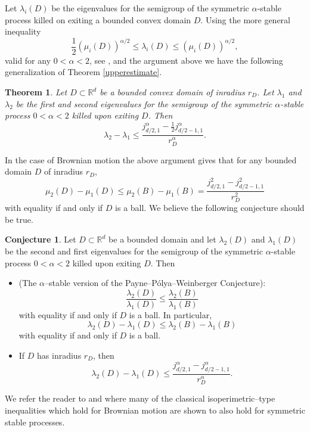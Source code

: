 \documentclass[11pt,leqno]{article}
\newtheorem{thm}{Theorem}[section]
\theoremstyle{definition}
\newtheorem{conj}{Conjecture}[section]
\newcommand{\Rd}{\mathbb{R}^d}
\numberwithin{equation}{section}
\begin{document}
Let $\lambda_i(D)$ be the eigenvalues for the semigroup of the symmetric $\alpha$-stable process killed on
exiting a bounded convex domain $D$. Using the more general inequality 
\begin{equation}
\frac{1}{2} \left(\mu_i(D)\right)^{\alpha/2}\leq \lambda_i(D)\leq \left(\mu_i(D)\right)^{\alpha/2},
\end{equation}
valid for any $0 < \alpha < 2$, see \cite{DeMe},  \cite{CS3} and the argument
above we have the following generalization of Theorem \ref{upperestimate}.
\begin{thm}
Let $D\subset \Rd$ be a bounded convex domain of inradius $r_D$.  Let $\lambda_1$ and
$\lambda_2$ be the  first and second eigenvalues for the semigroup of the symmetric 
$\alpha$-stable process $0 < \alpha < 2$ killed upon
exiting $D$.  Then 
\begin{equation} 
\lambda_2 - \lambda_1 \leq
{\frac{j_{{d/2}, 1}^{\alpha}-{\frac{1}{2}}j_{{d/2-1}, 1}^{\alpha}}{r_D^{\alpha}}}.
\end{equation}
\end{thm}

In the case of Brownian motion  the above argument gives  that for any bounded domain $D$ of
inradius $r_D$, 
\begin{equation} 
\mu_2(D) - \mu_1(D) \leq \mu_2(B) - \mu_1(B)=
{\frac{j_{{d/2}, 1}^{2}-j_{{d/2-1}, 1}^{2}}{r_D^{2}}}
\end{equation} 
with equality if and only if $D$ is a ball.    We believe the following conjecture
should be true. 
\begin{conj} Let $D\subset \Rd$ be a bounded domain and let $\lambda_2(D)$ and $\lambda_1(D)$ be the
second and first eigenvalues for the semigroup of the symmetric $\alpha$-stable process $0 < \alpha < 2$ killed upon
exiting $D$.  Then 
\begin{itemize}
\item[(i)] (The $\alpha$--stable version of the Payne--P\'olya--Weinberger Conjecture): 
\begin{equation*} 
\frac{\lambda_2(D) }{\lambda_1(D)} \leq
\frac{\lambda_2(B) }{\lambda_1(B)} 
\end{equation*}
with equality if and only if $D$ is a ball.  In particular, 
\begin{equation*} 
\lambda_2(D) - \lambda_1(D) \leq \lambda_2(B) - \lambda_1(B)
\end{equation*} 
with equality if and only if $D$ is a ball.
\item [(ii)] If $D$ has inradius $r_D$, then 
\begin{equation*} 
\lambda_2(D) - \lambda_1(D) \leq
{\frac{j_{{d/2}, 1}^{\alpha}-j_{{d/2-1}, 1}^{\alpha}}{r_D^{\alpha}}}.
\end{equation*}
\end{itemize}
\end{conj}
We refer the reader to \cite{BLM} and  \cite{Me} where many of the classical
isoperimetric--type inequalities which hold for Brownian motion are shown to also hold for
symmetric stable processes. 
\end{document}
